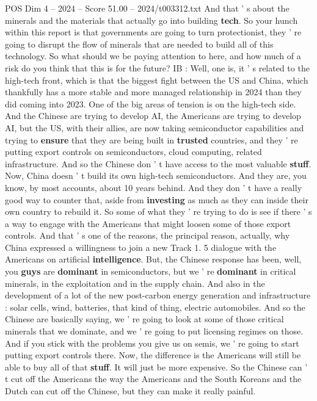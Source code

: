\begin{textsample}{POS Dim 4 – 2024 – Score 51.00 – 2024/t003312.txt}
And that ' s about the minerals and the materials that actually go into building \textbf{tech}.
So your hunch within this report is that governments are going to turn protectionist, they ' re going to disrupt the flow of minerals that are needed to build all of this technology.
So what should we be paying attention to here, and how much of a risk do you think that this is for the future?
IB : Well, one is, it ' s related to the high-tech front, which is that the biggest fight between the US and China, which thankfully has a more stable and more managed relationship in 2024 than they did coming into 2023.
One of the big areas of tension is on the high-tech side.
And the Chinese are trying to develop AI, the Americans are trying to develop AI, but the US, with their allies, are now taking semiconductor capabilities and trying to \textbf{ensure} that they are being built in \textbf{trusted} countries, and they ' re putting export controls on semiconductors, cloud computing, related infrastructure.
And so the Chinese don ' t have access to the most valuable \textbf{stuff}.
Now, China doesn ' t build its own high-tech semiconductors.
And they are, you know, by most accounts, about 10 years behind.
And they don ' t have a really good way to counter that, aside from \textbf{investing} as much as they can inside their own country to rebuild it.
So some of what they ' re trying to do is see if there ' s a way to engage with the Americans that might loosen some of those export controls.
And that ' s one of the reasons, the principal reason, actually, why China expressed a willingness to join a new Track 1. 5 dialogue with the Americans on artificial \textbf{intelligence}.
But, the Chinese response has been, well, you \textbf{guys} are \textbf{dominant} in semiconductors, but we ' re \textbf{dominant} in critical minerals, in the exploitation and in the supply chain.
And also in the development of a lot of the new post-carbon energy generation and infrastructure : solar cells, wind, batteries, that kind of thing, electric automobiles.
And so the Chinese are basically saying, we ' re going to look at some of those critical minerals that we dominate, and we ' re going to put licensing regimes on those.
And if you stick with the problems you give us on semis, we ' re going to start putting export controls there.
Now, the difference is the Americans will still be able to buy all of that \textbf{stuff}.
It will just be more expensive.
So the Chinese can ' t cut off the Americans the way the Americans and the South Koreans and the Dutch can cut off the Chinese, but they can make it really painful.

\end{textsample}

